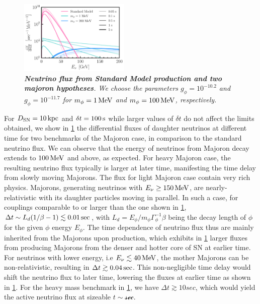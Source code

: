 \begin{figure}[t!]
    \centering
    \includegraphics[width=0.47\textwidth]{figures/majoran_fluxes.pdf}
    \caption{\textit{\textbf{Neutrino flux from Standard Model production and two majoron hypotheses}.
    We choose the parameters $g_\phi = 10^{-10.2}$ and $g_\phi = 10^{-11.7}$ for $m_\phi = \unit[1]{MeV}$ and $m_\phi = \unit[100]{MeV}$, respectively.}
    }
    \label{fig:fluxes}
\end{figure}

For $D_{\rm SN} = \unit[10]{kpc}$ and $\delta t = \unit[100]{s}$ while larger values of $\delta t$ do not affect the limits obtained, we show in \cref{fig:fluxes} the differential fluxes of daughter neutrinos at different time for two benchmarks of the Majoron case, in comparison to the standard neutrino flux.
We can observe that the energy of neutrinos from Majoron decay extends to $\unit[100]{MeV}$ and above, as expected. For heavy Majoron case, the resulting neutrino flux typically is larger at later time, manifesting the time delay from slowly moving Majorons. 
The flux for light Majoron case contain very rich physics. Majorons, generating neutrinos with $E_\nu \geq \unit[150]{MeV}$, are nearly-relativistic with its daughter particles moving in parallel. In such a case, for couplings comparable to or larger than the one shown in \cref{fig:fluxes}, $\Delta t \sim L_d (1/\beta -1)\lesssim \unit[0.01]{sec}$, with $L_d = E_\phi/m_\phi \Gamma^{-1}_\phi \beta$ being the decay length of $\phi$ for the given $\phi$ energy $E_\phi$. The time dependence of neutrino flux thus are mainly inherited from the Majorons upon production, which exhibits in \cref{fig:fluxes} larger fluxes from producing Majorons from the denser and hotter core of SN at earlier time.
For neutrinos with lower energy, i.e $E_\nu \lesssim \unit[40]{MeV}$, the mother Majorons can be non-relativistic, resulting in $\Delta t \gtrsim \unit[0.04]{sec}$. This non-negligible time delay would shift the neutrino flux to later time, lowering the fluxes at earlier time as shown in \cref{fig:fluxes}. For the heavy mass benchmark in \cref{fig:fluxes}, we have $\Delta t \gtrsim 10 sec$, which would yield the active neutrino flux at sizeable $t\sim \mathcal{sec}$.

